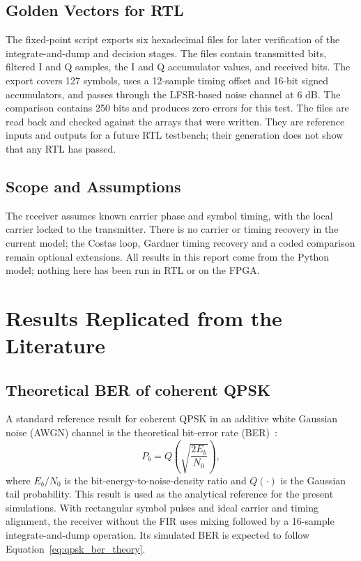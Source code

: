 \documentclass[10pt,twocolumn,letterpaper]{article}
\begin{document}
\subsection{Golden Vectors for RTL}
The fixed-point script exports six hexadecimal files for later verification of the integrate-and-dump and decision stages. The files contain transmitted bits, filtered I and Q samples, the I and Q accumulator values, and received bits. The export covers 127 symbols, uses a 12-sample timing offset and 16-bit signed accumulators, and passes through the LFSR-based noise channel at 6 dB. The comparison contains 250 bits and produces zero errors for this test. The files are read back and checked against the arrays that were written. They are reference inputs and outputs for a future RTL testbench; their generation does not show that any RTL has passed.

\subsection{Scope and Assumptions}
\label{sec:scope}

The receiver assumes known carrier phase and symbol timing, with the local
carrier locked to the transmitter. There is no carrier or timing recovery in
the current model; the Costas loop, Gardner timing recovery and a coded
comparison remain optional extensions. All results in this report come from
the Python model; nothing here has been run in RTL or on the FPGA.

\section{Results Replicated from the Literature}

\subsection{Theoretical BER of coherent QPSK}
A standard reference result for coherent QPSK in an additive white Gaussian noise (AWGN) channel is the theoretical bit-error rate (BER)~\cite{proakis}:
\begin{equation}
 P_b=Q\!\left(\sqrt{\frac{2E_b}{N_0}}\right),
 \label{eq:qpsk_ber_theory}
\end{equation}
where $E_b/N_0$ is the bit-energy-to-noise-density ratio and $Q(\cdot)$ is the Gaussian tail probability. This result is used as the analytical reference for the present simulations. With rectangular symbol pulses and ideal carrier and timing alignment, the receiver without the FIR uses mixing followed by a 16-sample integrate-and-dump operation. Its simulated BER is expected to follow Equation~\ref{eq:qpsk_ber_theory}.
\end{document}
